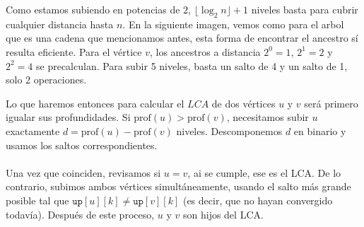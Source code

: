 Como estamos subiendo en potencias de $2$, $\lfloor \log_2 n \rfloor + 1$ niveles basta para cubrir cualquier distancia hasta $n$. En la siguiente imagen, vemos como para el arbol que es una cadena que mencionamos antes, esta forma de encontrar el ancestro sí resulta eficiente. Para el vértice $v$, los ancestros a distancia $2^0=1$, $2^1=2$ y $2^2=4$ se precalculan. Para subir 5 niveles, basta un salto de 4 y un salto de 1, solo 2 operaciones.
 
\begin{figure}[H]
\centering
{}
\end{figure}

Lo que haremos entonces para calcular el $LCA$  de dos vértices $u$ y $v$ será primero igualar sus profundidades. Si $\text{prof}(u) > \text{prof}(v)$, necesitamos subir $u$ exactamente $d = \text{prof}(u) - \text{prof}(v)$ niveles. Descomponemos $d$ en binario y usamos los saltos correspondientes.
\\\\
Una vez que coinciden, revisamos si $u = v$, ai se cumple, ese es el LCA. De lo contrario, subimos ambos vértices simultáneamente, usando el salto más grande posible tal que $\texttt{up}[u][k] \neq \texttt{up}[v][k]$ (es decir, que no hayan convergido todavía). Después de este proceso, $u$ y $v$ son hijos del LCA.

